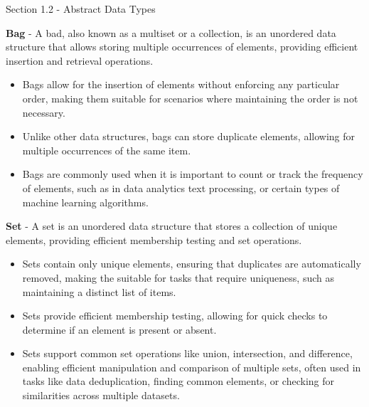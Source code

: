 \begin{notes}{Section 1.2 - Abstract Data Types}
    \begin{highlight}[Bag]
        \textbf{Bag} - A bad, also known as a multiset or a collection, is an unordered data structure that allows storing multiple occurrences of elements, providing efficient
        insertion and retrieval operations.
        \begin{itemize}
            \item Bags allow for the insertion of elements without enforcing any particular order, making them suitable for scenarios where maintaining the order is not necessary.
            \item Unlike other data structures, bags can store duplicate elements, allowing for multiple occurrences of the same item.
            \item Bags are commonly used when it is important to count or track the frequency of elements, such as in data analytics text processing, or certain types of machine learning
            algorithms.
        \end{itemize}
    \end{highlight}

    \begin{highlight}[Set]
        \textbf{Set} - A set is an unordered data structure that stores a collection of unique elements, providing efficient membership testing and set operations.
        \begin{itemize}
            \item Sets contain only unique elements, ensuring that duplicates are automatically removed, making the suitable for tasks that require uniqueness, such as maintaining a distinct
            list of items.
            \item Sets provide efficient membership testing, allowing for quick checks to determine if an element is present or absent.
            \item Sets support common set operations like union, intersection, and difference, enabling efficient manipulation and comparison of multiple sets, often used in tasks like data
            deduplication, finding common elements, or checking for similarities across multiple datasets.
        \end{itemize}
    \end{highlight}


\end{notes}
